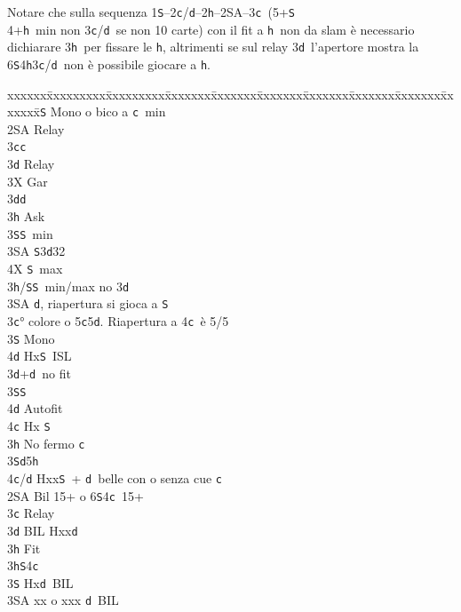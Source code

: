\documentclass[a4paper,italian]{article}
\newcommand{\BS}{\small{\texttt{S}}}
\newcommand{\BC}{\small{\texttt{c}}}
\newcommand{\BD}{\small{\texttt{d}}}
\newcommand{\BH}{\small{\texttt{h}}}
\newenvironment{bidtable}
{\begin{tabbing}

    xxxxxx\=xxxxxxxxx\=xxxxxxxxx\=xxxxxxx\=xxxxxxx\=xxxxxxx\=xxxxxxx\=xxxxxxx\=xxxxxxx\=xxxxxxx\=\kill}
{\end{tabbing} }%
\newenvironment{varie}[1]
{\begin{tcolorbox}[colframe=green!40!black,title=#1]}
    {
\end{tcolorbox} }%
\begin{document}
\begin{multicols}{2}
\begin{varie}{Riepilogo mnemonico per i fissaggi}
    Notare che sulla sequenza 1\BS--2\BC/\BD--2\BH--2\small{SA}--3\BC\ (5+\BS\\4+\BH\ min
    non 3\BC/\BD\ se non 10 carte) con il fit a \BH\ non da slam è necessario
    dichiarare 3\BH\ per fissare le \BH, altrimenti se sul relay 3\BD\
    l'apertore mostra la 6\BS4\BH3\BC/\BD\ non è possibile giocare a \BH.
    \end{varie}
    \columnbreak
    \begin{bidtable}
        2\BS \> Mono o bico a \BC\ min\+\\
        2\small{SA} \> Relay\+\\
        3\BC {}\BC \+\\
        3\BD \> Relay\+\\
        3X \> Gar\-\-\\
        3\BD {}\BD \+\\
        3\BH \> Ask\+\\
        3\BS {}\BS\ min\\
        3\small{SA} \BS 3\BD 32\\
        4X \BS\ max\-\-\\
        3\BH/\BS \> 6\BS\ min/max no 3\BD \\
        3\small{SA} \BD , riapertura si gioca a \BS \-\\
        3\BC {}° colore o 5\BC 5\BD . Riapertura a 4\BC\ è 5/5\+\\
        3\BS \> Mono\+\\
        4\BD \> Hx\BS\ ISL\-\-\\
        3\BD {}+\BD\ no fit\+\\
        3\BS \> 6\BS \+\\
        4\BD \> Autofit\\
        4\BC \> Hx \BS \-\-\\
        3\BH \> No fermo \BC \\
        3\BS {}\BD 5\BH \\
        4\BC/\BD \> Hxx\BS\ + \BD\ belle con o senza cue \BC\-\\
        2\small{SA} \> Bil 15+ o 6\BS 4\BC\ 15+\+\\
        3\BC \> Relay\+\\
        3\BD \> BIL Hxx\BD \+\\
        3\BH \> Fit\-\\
        3\BH {}\BS 4\BC \\
        3\BS \> Hx\BD\ BIL\\
        3\small{SA} \> xx o xxx \BD\ BIL\-\\

\end{bidtable}
\end{multicols}
\end{document}
